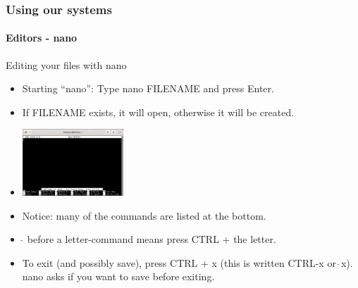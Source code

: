 \documentclass{beamer}
\begin{document}
\begin{frame}[fragile]
  \frametitle{Using our systems}\framesubtitle{Editors - nano}

  \begin{block}{}
    \justify
    Editing your files with nano
  \end{block}

  \begin{block}{}
     \begin{itemize}
     \item Starting “nano”: Type nano FILENAME and press Enter.
     \item If FILENAME exists, it will open, otherwise it will be created.
     \item \includegraphics[height=2.5cm]{figures/nano.png}
     \item Notice: many of the commands are listed at the bottom.
     \item $\hat{\, }$ before a letter-command means press CTRL + the letter.
     \item To exit (and possibly save), press CTRL + x (this is written CTRL-x or $\hat{\, }$x). nano asks if you want to save before exiting.
 \end{itemize}
  \end{block}
\end{frame}
\end{document}
